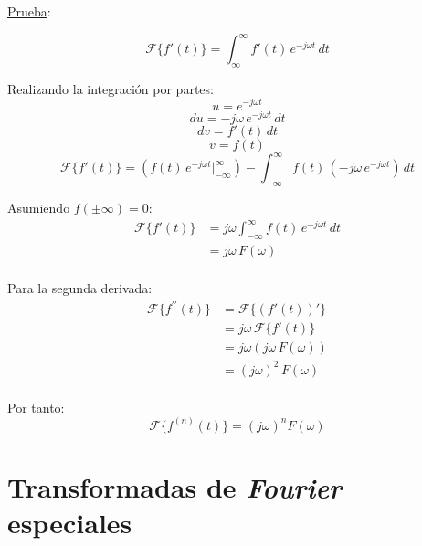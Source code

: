 \underline{Prueba}:

\begin{equation*}
    \mathcal{F}\{f'(t)\}=\int_{\infty}^\infty f'(t)\,e^{-j\omega t}\,dt
\end{equation*}

Realizando la integración por partes:
\begin{equation*}
    u=e^{-j\omega t}
\end{equation*}
\begin{equation*}
    du=-j\omega\,e^{-j\omega t}\,dt
\end{equation*}
\begin{equation*}
    dv=f'(t)\,dt
\end{equation*}
\begin{equation*}
    v=f(t)
\end{equation*}
\begin{equation*}
    \mathcal{F}\{f'(t)\}
        =\left(f(t)\,e^{-j\omega t}\Biggr|_{-\infty}^\infty\right)
        -\int_{-\infty}^\infty f(t)\,(-j\omega\,e^{-j\omega t})\,dt
\end{equation*}

Asumiendo $f(\pm\infty)=0$:
\begin{equation*}
\begin{split}
    \mathcal{F}\{f'(t)\}
        &=j\omega\int_{-\infty}^\infty f(t)\,e^{-j\omega t}\,dt\\
        &=j\omega\,F(\omega)\\
\end{split}
\end{equation*}

Para la segunda derivada:
\begin{equation*}
\begin{split}
    \mathcal{F}\{f^{\prime\prime}(t)\}
        &=\mathcal{F}\{(f'(t))'\}\\
        &=j\omega\,\mathcal{F}\{f'(t)\}\\
        &=j\omega(j\omega\,F(\omega))\\
        &={(j\omega)}^2\,F(\omega)\\
\end{split}
\end{equation*}

Por tanto:
\begin{equation*}
    \mathcal{F}\{f^{(n)}(t)\}={(j\omega)}^n F(\omega)
\end{equation*}

\section{Transformadas de \emph{Fourier} especiales}
